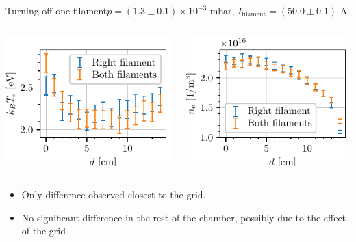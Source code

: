 \documentclass[10pt]{beamer}
\newcommand{\filamentcurrent}{\ensuremath{I_{\mathrm{filament}}}}
\begin{document}
\begin{frame}{Turning off one filament}{$p = (1.3 \pm 0.1) \times 10^{-3}$ mbar, $\filamentcurrent = (50.0 \pm 0.1)$ A}
    \begin{columns}
        \centering
        \includegraphics[scale=1]{../figures/temperatureeV_position_twofilaments.pdf}

        \centering
        \includegraphics[scale=1]{../figures/density_position_twofilaments.pdf}

    \end{columns}
    \vspace{0.5cm}
    \begin{itemize}
        \item Only difference observed closest to the grid.
        \item No significant difference in the rest of the chamber, possibly due to the effect of the grid
    \end{itemize}
\end{frame}
\end{document}
